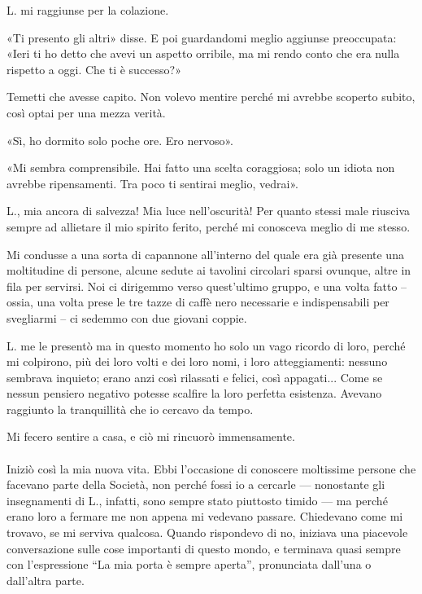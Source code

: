\documentclass[a4paper,12pt]{book}
\begin{document}
L. mi raggiunse per la colazione.

«Ti presento gli altri» disse. E poi guardandomi meglio aggiunse preoccupata:
«Ieri ti ho detto che avevi un aspetto orribile, ma mi rendo conto che era nulla
rispetto a oggi. Che ti è successo?»

Temetti che avesse capito. Non volevo mentire perché mi avrebbe scoperto subito,
così optai per una mezza verità.

«Sì, ho dormito solo poche ore. Ero nervoso».

«Mi sembra comprensibile. Hai fatto una scelta coraggiosa; solo un idiota non
avrebbe ripensamenti. Tra poco ti sentirai meglio, vedrai».

L., mia ancora di salvezza! Mia luce nell'oscurità! Per quanto stessi male
riusciva sempre ad allietare il mio spirito ferito, perché mi conosceva meglio
di me stesso.

Mi condusse a una sorta di capannone all'interno del quale era già presente una
moltitudine di persone, alcune sedute ai tavolini circolari sparsi ovunque,
altre in fila per servirsi. Noi ci dirigemmo verso quest'ultimo gruppo, e una
volta fatto -- ossia, una volta prese le tre tazze di caffè nero necessarie e
indispensabili per svegliarmi -- ci sedemmo con due giovani coppie.

L. me le presentò ma in questo momento ho solo un vago ricordo di loro, perché
mi colpirono, più dei loro volti e dei loro nomi, i loro atteggiamenti: nessuno
sembrava inquieto; erano anzi così rilassati e felici, così appagati... Come se
nessun pensiero negativo potesse scalfire la loro perfetta esistenza. Avevano
raggiunto la tranquillità che io cercavo da tempo.

Mi fecero sentire a casa, e ciò mi rincuorò immensamente.

\paragraph{}
Iniziò così la mia nuova vita. Ebbi l'occasione di conoscere moltissime persone
che facevano parte della Società, non perché fossi io a cercarle --- nonostante
gli insegnamenti di L., infatti, sono sempre stato piuttosto timido --- ma
perché erano loro a fermare me non appena mi vedevano passare. Chiedevano come
mi trovavo, se mi serviva qualcosa. Quando rispondevo di no, iniziava una
piacevole conversazione sulle cose importanti di questo mondo, e terminava
quasi sempre con l'espressione ``La mia porta è sempre aperta'', pronunciata
dall'una o dall'altra parte.
\end{document}
